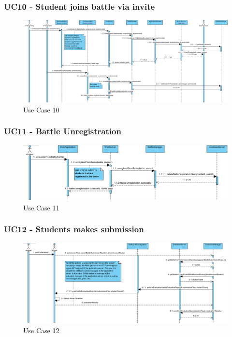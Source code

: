 \documentclass{article}
\begin{document}
\subsubsection*{UC10 - Student joins battle via invite}

\begin{figure}[H]
    \centering
    \includegraphics[width=1\textwidth]{images/UseCaseSequenceDiagrams/UC10}
    \caption{Use Case 10}
    \label{fig:UC10}
\end{figure}

\subsubsection*{UC11 - Battle Unregistration}

\begin{figure}[H]
    \centering
    \includegraphics[width=1\textwidth]{images/UseCaseSequenceDiagrams/UC11}
    \caption{Use Case 11}
    \label{fig:UC11}
\end{figure}

\subsubsection*{UC12 - Students makes submission}

\begin{figure}[H]
    \centering
    \includegraphics[width=1\textwidth]{images/UseCaseSequenceDiagrams/UC12}
    \caption{Use Case 12}
    \label{fig:UC12}
\end{figure}
\end{document}
